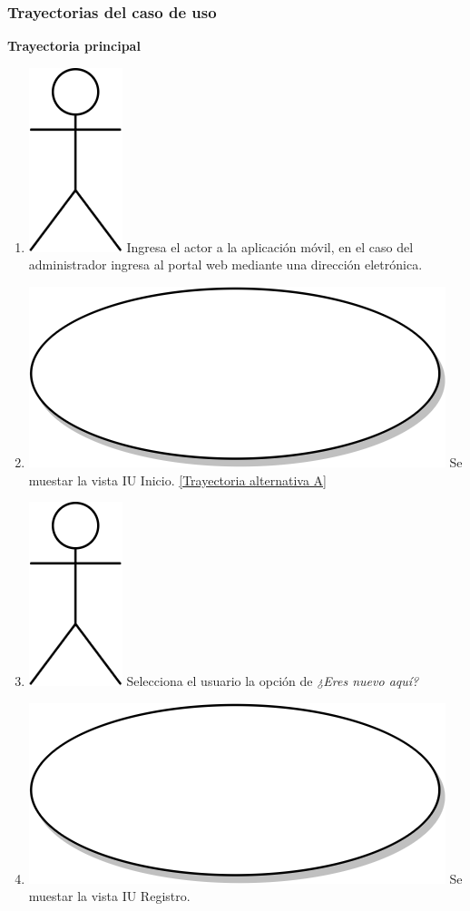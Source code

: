 \subsubsection{Trayectorias del caso de uso}
\textbf{Trayectoria principal}
\begin{enumerate}
  \item {\includegraphics[scale=.1]{Capitulo3/img/actor.png} Ingresa el actor a la aplicación móvil, en el caso del administrador ingresa al portal web mediante una dirección eletrónica.}
  \item {\includegraphics[scale=.05]{Capitulo3/img/proceso.png} Se muestar la vista IU Inicio. \hyperref[cu2_ta_a]{[Trayectoria alternativa A]}}
  \item {\includegraphics[scale=.1]{Capitulo3/img/actor.png} Selecciona el usuario la opción de \textit{¿Eres nuevo aquí?}}
  \item {\includegraphics[scale=.05]{Capitulo3/img/proceso.png} Se muestar la vista IU Registro.}

\end{enumerate}

